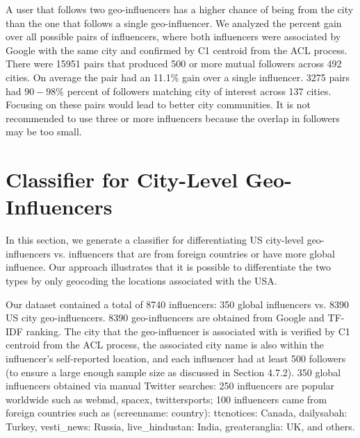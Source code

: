 A user that follows two geo-influencers has a higher chance of being from the city than the one that follows a single geo-influencer. We analyzed the percent gain over all possible pairs of influencers, where both influencers were associated by Google with the same city and confirmed by C1 centroid from the ACL process. There were 15951 pairs that produced 500 or more mutual followers across 492 cities. On average the pair had an 11.1\% gain over a single influencer. 3275 pairs had $90-98$\% percent of followers matching city of interest across 137 cities. Focusing on these pairs would lead to better city communities. It is not recommended to use three or more influencers because the overlap in followers may be too small.%

\section{Classifier for City-Level Geo-Influencers}

In this section, we generate a classifier for differentiating US city-level geo-influencers vs. influencers that are from foreign countries or have more global influence. Our approach illustrates that it is possible to differentiate the two types by only geocoding the locations associated with the USA. 

Our dataset contained a total of 8740 influencers: 350 global influencers vs. 8390 US city geo-influencers. 8390 geo-influencers are obtained from Google and TF-IDF ranking. The city that the geo-influencer is associated with is verified by C1 centroid from the ACL process, the associated city name is also within the influencer's self-reported location, and each influencer had at least 500 followers (to ensure a large enough sample size as discussed in Section 4.7.2). 350 global influencers obtained via manual Twitter searches: 250 influencers are popular worldwide such as webmd, spacex, twittersports; 100 influencers came from foreign countries such as (screenname: country): ttcnotices: Canada, dailysabah: Turkey, vesti{\_}news: Russia, live{\_}hindustan: India, greateranglia: UK, and others.

